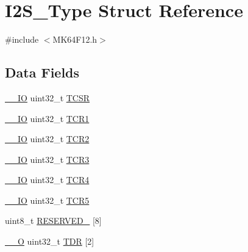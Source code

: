 \hypertarget{struct_i2_s___type}{}\section{I2\+S\+\_\+\+Type Struct Reference}
\label{struct_i2_s___type}


{\ttfamily \#include $<$M\+K64\+F12.\+h$>$}

\subsection*{Data Fields}
\begin{DoxyCompactItemize}
\item 
\mbox{\hyperlink{core__cm4_8h_aec43007d9998a0a0e01faede4133d6be}{\+\_\+\+\_\+\+IO}} uint32\+\_\+t \mbox{\hyperlink{group___v_r_e_f___peripheral___access___layer_gae25f25d231ebd0797ab668fafc159cb1}{T\+C\+SR}}
\item 
\mbox{\hyperlink{core__cm4_8h_aec43007d9998a0a0e01faede4133d6be}{\+\_\+\+\_\+\+IO}} uint32\+\_\+t \mbox{\hyperlink{group___v_r_e_f___peripheral___access___layer_gac45e21023c3fd22f6a7217adf594e1cf}{T\+C\+R1}}
\item 
\mbox{\hyperlink{core__cm4_8h_aec43007d9998a0a0e01faede4133d6be}{\+\_\+\+\_\+\+IO}} uint32\+\_\+t \mbox{\hyperlink{group___v_r_e_f___peripheral___access___layer_ga6f5b1e92ab914ccb0f1b97526680f96c}{T\+C\+R2}}
\item 
\mbox{\hyperlink{core__cm4_8h_aec43007d9998a0a0e01faede4133d6be}{\+\_\+\+\_\+\+IO}} uint32\+\_\+t \mbox{\hyperlink{group___v_r_e_f___peripheral___access___layer_gacb3874d5b17f1a69cda183bfb5c19f01}{T\+C\+R3}}
\item 
\mbox{\hyperlink{core__cm4_8h_aec43007d9998a0a0e01faede4133d6be}{\+\_\+\+\_\+\+IO}} uint32\+\_\+t \mbox{\hyperlink{group___v_r_e_f___peripheral___access___layer_gab18c2c7b12ad4a466b93d1a13f7ccda6}{T\+C\+R4}}
\item 
\mbox{\hyperlink{core__cm4_8h_aec43007d9998a0a0e01faede4133d6be}{\+\_\+\+\_\+\+IO}} uint32\+\_\+t \mbox{\hyperlink{group___v_r_e_f___peripheral___access___layer_ga643051e6a1c91721805df0d32f89527c}{T\+C\+R5}}
\item 
uint8\+\_\+t \mbox{\hyperlink{group___v_r_e_f___peripheral___access___layer_gab5b3e978eb3ceb8a2aadaeeab28db00b}{R\+E\+S\+E\+R\+V\+E\+D\+\_}} \mbox{[}8\mbox{]}
\item 
\mbox{\hyperlink{core__cm4_8h_a7e25d9380f9ef903923964322e71f2f6}{\+\_\+\+\_\+O}} uint32\+\_\+t \mbox{\hyperlink{group___v_r_e_f___peripheral___access___layer_ga6fe1dda34b3cea236dfdd02efe92a380}{T\+DR}} \mbox{[}2\mbox{]}

\end{DoxyCompactItemize}
